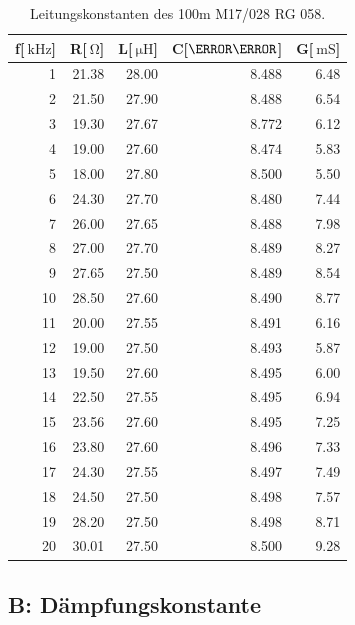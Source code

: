 \begin{table}
\centering
	\caption[]{Leitungskonstanten des 100m M17/028 RG 058.}
	\begin{tabular}{r r r r r}
		f[$\SI{}{\kilo\hertz}$] & R[$\SI{}{\ohm}$] & L[$\SI{}{\micro\henry}$] & C[$\nano\farad$] & G[$\SI{}{\milli\siemens}$]\\
		\hline \hline
			  1	&	21.38	&	28.00	&	8.488	&	6.48\\
			  2	&	21.50	&	27.90	&	8.488	&	6.54\\
			  3	&	19.30	&	27.67	&	8.772	&	6.12\\
			  4	&	19.00	&	27.60	&	8.474	&	5.83\\
			  5	&	18.00	&	27.80	&	8.500	&	5.50\\
			  6	&	24.30	&	27.70	&	8.480	&	7.44\\
			  7	&	26.00	&	27.65	&	8.488	&	7.98\\
			  8	&	27.00	&	27.70	&	8.489	&	8.27\\
			  9	&	27.65	&	27.50	&	8.489	&	8.54\\
			 10	&	28.50	&	27.60	&	8.490	&	8.77\\
			 11	&	20.00	&	27.55	&	8.491	&	6.16\\
			 12	&	19.00	&	27.50	&	8.493	&	5.87\\
			 13	&	19.50	&	27.60	&	8.495	&	6.00\\
			 14	&	22.50	&	27.55	&	8.495	&	6.94\\
			 15	&	23.56	&	27.60	&	8.495	&	7.25\\
			 16	&	23.80	&	27.60	&	8.496	&	7.33\\
			 17	&	24.30	&	27.55	&	8.497	&	7.49\\
			 18	&	24.50	&	27.50	&	8.498	&	7.57\\
			 19	&	28.20	&	27.50	&	8.498	&	8.71\\
			 20	&	30.01	&	27.50	&	8.500	&	9.28\\
			\hline
	\end{tabular}
	\label{tab_konst3}
\end{table}

\FloatBarrier
\subsection{B: Dämpfungskonstante} %
\label{sub:b_}


